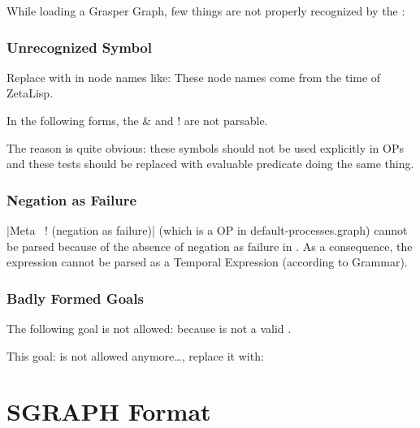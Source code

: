While loading a Grasper Graph, few things are not properly recognized by
the \OPEditor:



\subsubsection{Unrecognized Symbol}

Replace \code{|\#:|} with \code{|\#} in node names like: 
These node names come from the time of ZetaLisp.

In the following forms, the \& and ! are not parsable.



The reason is quite obvious: these symbols should not be used explicitly in OPs
and these tests should be replaced with evaluable predicate doing the same
thing.

\subsubsection{Negation as Failure}

|Meta ~! (negation as failure)| (which is a OP in default-processes.graph)
cannot be parsed because of the absence of negation as failure in \COPRS{}.  As
a consequence, the expression  cannot be parsed as a Temporal
Expression (according to \COPRS{} Grammar).

\subsubsection{Badly Formed Goals}

The following goal is not allowed: \*
 \*
because  is not a valid .

This goal: \*
 \*
is not allowed anymore\dots{}, replace it with: \*
 \*

\section{SGRAPH Format}

